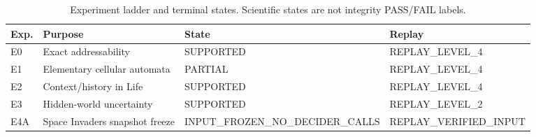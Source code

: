 \begin{table}[t]
\centering
\small
\begin{tabular}{llll}
\toprule
Exp. & Purpose & State & Replay \\
\midrule
E0 & Exact addressability & SUPPORTED & REPLAY\_LEVEL\_4 \\
E1 & Elementary cellular automata & PARTIAL & REPLAY\_LEVEL\_4 \\
E2 & Context/history in Life & SUPPORTED & REPLAY\_LEVEL\_4 \\
E3 & Hidden-world uncertainty & SUPPORTED & REPLAY\_LEVEL\_2 \\
E4A & Space Invaders snapshot freeze & INPUT\_FROZEN\_NO\_DECIDER\_CALLS & REPLAY\_VERIFIED\_INPUT \\
\bottomrule
\end{tabular}
\caption{Experiment ladder and terminal states. Scientific states are not integrity PASS/FAIL labels.}
\label{tab:experiments}
\end{table}
